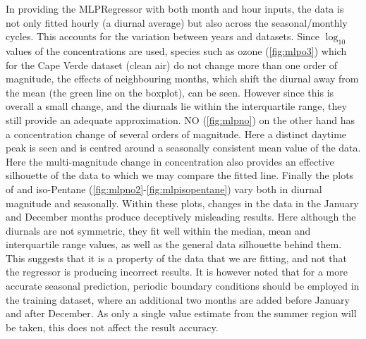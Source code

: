 In providing the MLPRegressor with both month and hour inputs, the data is not only fitted hourly (a diurnal average) but also across the seasonal/monthly cycles. This accounts for the variation between years and datasets. Since $\log_{10}$ values of the concentrations are used, species such as ozone (\autoref{fig:mlpo3}) which for the Cape Verde dataset (clean air) do not change more than one order of magnitude, the effects of neighbouring months, which shift the diurnal away from the mean (the green line on the boxplot), can be seen. However since this is overall a small change, and the diurnals lie within the interquartile range, they still provide an adequate approximation. NO (\autoref{fig:mlpno}) on the other hand has a concentration change of several orders of magnitude. Here a distinct daytime peak is seen and is centred around a seasonally consistent mean value of the data. Here the multi-magnitude change in concentration also provides an effective silhouette of the data to which we may compare the fitted line. 
Finally the plots of  and iso-Pentane (\autoref{fig:mlpno2}-\ref{fig:mlpisopentane}) vary both in diurnal magnitude and seasonally. Within these plots, changes in the data in the January and December months produce deceptively misleading results. Here although the diurnals are not symmetric, they fit well within the median, mean and interquartile range values, as well as the general data silhouette behind them. This suggests that it is a property of the data that we are fitting, and not that the regressor is producing incorrect results. It is however noted that for a more accurate seasonal prediction, periodic boundary conditions should be employed in the training dataset, where an additional two months are added before January and after December. As only a single value estimate from the summer region will be taken, this does not affect the result accuracy. 


